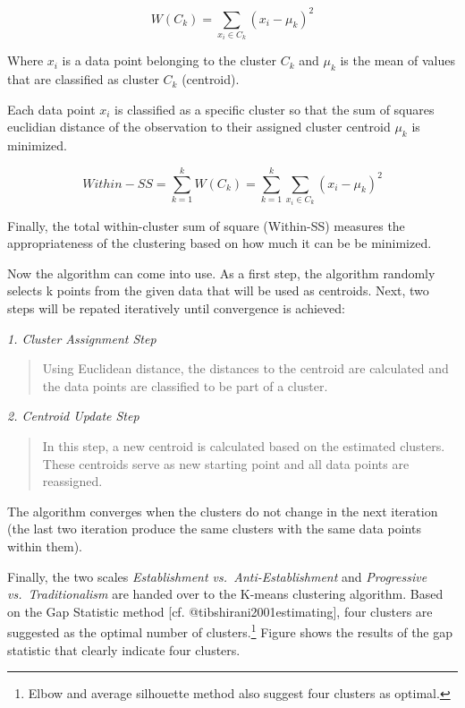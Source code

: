 \documentclass[]{article}
\let\rmarkdownfootnote\footnote%
\def\footnote{\protect\rmarkdownfootnote}
\begin{document}
\[W(C_k) = \sum_{x_i \in C_k}(x_i - \mu_k)^2\]

Where \(x_i\) is a data point belonging to the cluster \(C_k\) and
\(\mu_k\) is the mean of values that are classified as cluster \(C_k\)
(centroid).

Each data point \(x_i\) is classified as a specific cluster so that the
sum of squares euclidian distance of the observation to their assigned
cluster centroid \(\mu_k\) is minimized.

\[Within-SS = \sum^k_{k=1}W(C_k) = \sum^k_{k=1}\sum_{x_i \in C_k}(x_i - \mu_k)^2\]

Finally, the total within-cluster sum of square (Within-SS) measures the
appropriateness of the clustering based on how much it can be be
minimized.

Now the algorithm can come into use. As a first step, the algorithm
randomly selects k points from the given data that will be used as
centroids. Next, two steps will be repated iteratively until convergence
is achieved:

\emph{1. Cluster Assignment Step}

\begin{quote}
Using Euclidean distance, the distances to the centroid are calculated
and the data points are classified to be part of a cluster.
\end{quote}

\emph{2. Centroid Update Step}

\begin{quote}
In this step, a new centroid is calculated based on the estimated
clusters. These centroids serve as new starting point and all data
points are reassigned.
\end{quote}

The algorithm converges when the clusters do not change in the next
iteration (the last two iteration produce the same clusters with the
same data points within them).

Finally, the two scales \emph{Establishment vs.~Anti-Establishment} and
\emph{Progressive vs.~Traditionalism} are handed over to the K-means
clustering algorithm. Based on the Gap Statistic method {[}cf.
@tibshirani2001estimating{]}, four clusters are suggested as the optimal
number of clusters.\footnote{Elbow and average silhouette method also
  suggest four clusters as optimal.} Figure \label{fig:gap} shows the
results of the gap statistic that clearly indicate four clusters.
\end{document}
